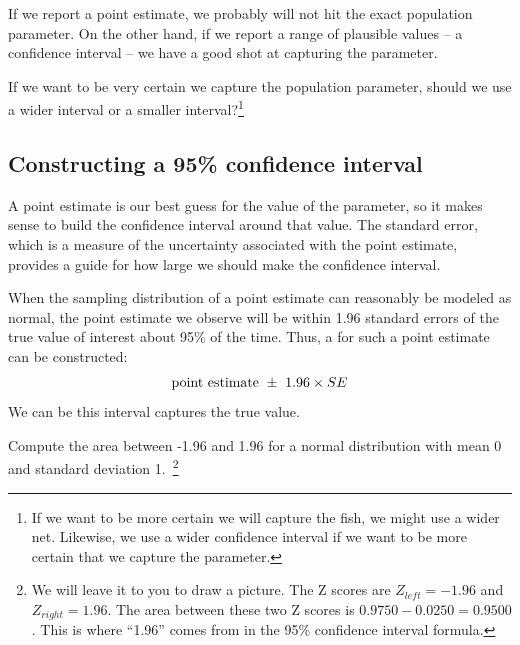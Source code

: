 If we report a point estimate, we probably will not hit the exact population parameter. On the other hand, if we report a range of plausible values -- a confidence interval -- we have a good shot at capturing the parameter.

\begin{exercise}
If we want to be very certain we capture the population parameter, should we use a wider interval or a smaller interval?\footnote{If we want to be more certain we will capture the fish, we might use a wider net. Likewise, we use a wider confidence interval if we want to be more certain that we capture the parameter.}
\end{exercise}


\subsection{Constructing a 95\% confidence interval}

A point estimate is our best guess for the value of the parameter, so it makes sense to build the confidence interval around that value. The standard error, which is a measure of the uncertainty associated with the point estimate, provides a guide for how large we should make the confidence interval.

\begin{termBox}{
When the sampling distribution of a point estimate can reasonably be modeled as normal, the point estimate we observe will be within 1.96 standard errors of the true value of interest about 95\% of the time. Thus, a  for such a point estimate can be constructed:\vspace{-2mm}
\begin{align}
\text{point estimate}\ \pm\ 1.96 \times SE\vspace{-1mm}
\label{95PercentConfidenceIntervalFormula}
\end{align}
We can be  this interval captures the true value.}
\end{termBox}

\begin{exercise}
Compute the area between -1.96 and 1.96 for a normal distribution with mean 0 and standard deviation 1.~\footnote{We will leave it to you to draw a picture. The Z scores are $Z_{left} = -1.96$ and $Z_{right} = 1.96$. The area between these two Z scores is $0.9750 - 0.0250 = 0.9500$. This is where ``1.96'' comes from in the 95\% confidence interval formula.}
\end{exercise}

